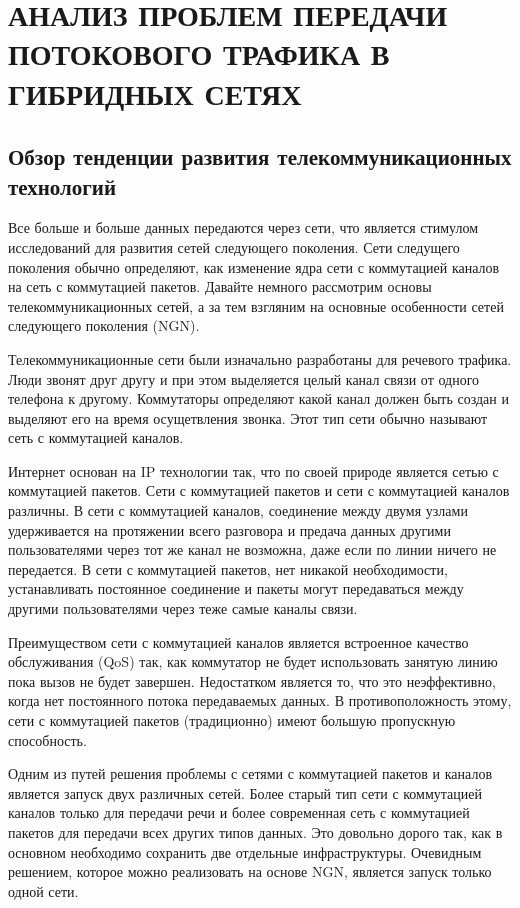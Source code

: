 \chapter{АНАЛИЗ ПРОБЛЕМ ПЕРЕДАЧИ ПОТОКОВОГО ТРАФИКА В ГИБРИДНЫХ СЕТЯХ} \label{chapt1}


\section{Обзор тенденции развития телекоммуникационных технологий} \label{sect1_0}

Все больше и больше данных передаются через сети, что является стимулом исследований для развития сетей следующего поколения.
Сети следущего поколения обычно определяют, как изменение ядра сети с коммутацией каналов на сеть с коммутацией пакетов.
Давайте немного рассмотрим основы телекоммуникационных сетей, а за тем взгляним на основные особенности сетей следующего поколения (NGN).

Телекоммуникационные сети были изначально разработаны для речевого трафика. 
Люди звонят друг другу и при этом выделяется целый канал связи от одного телефона к другому. 
Коммутаторы определяют какой канал должен быть создан и выделяют его на время осущетвления звонка.
Этот тип сети обычно называют сеть с коммутацией каналов.

Интернет основан на IP технологии так, что по своей природе является сетью с коммутацией пакетов.
Сети с коммутацией пакетов и сети с коммутацией каналов различны.
В сети с коммутацией каналов, соединение между двумя узлами удерживается на протяжении всего разговора и предача данных другими пользователями через тот же канал не возможна, даже если по линии ничего не передается.
В сети с коммутацией пакетов, нет никакой необходимости, устанавливать постоянное соединение и пакеты могут передаваться между другими пользователями через теже самые каналы связи.

Преимуществом сети с коммутацией каналов является встроенное качество обслуживания (QoS) так, как коммутатор не будет использовать занятую линию пока вызов не будет завершен.
Недостатком является то, что это неэффективно, когда нет постоянного потока передаваемых данных.
В противоположность этому, сети с коммутацией пакетов (традиционно) имеют большую пропускную способность.

Одним из путей решения проблемы с сетями с коммутацией пакетов и каналов является запуск двух различных сетей. 
Более старый тип сети с коммутацией каналов только для передачи речи и более современная сеть с коммутацией пакетов для передачи всех других типов данных.
Это довольно дорого так, как в основном необходимо сохранить две отдельные инфраструктуры.
Очевидным решением, которое можно реализовать на основе NGN, является запуск только одной сети.


